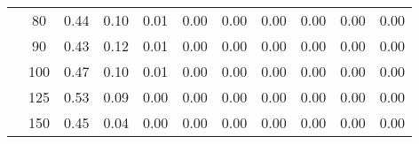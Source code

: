 \begin{table}[t]
\begin{center}
\begin{subtable}[c]{\textwidth}
\begin{center}
\begin{tabular}{rcccccccccc}
                                            & \multicolumn{1}{c|}{80}  & \num{0.44}  & \num{0.10}  & \num{0.01}  & \num{0.00}  & \num{0.00}  & \num{0.00}  & \num{0.00}  & \num{0.00}  & \num{0.00}  \\
                                            & \multicolumn{1}{c|}{90}  & \num{0.43}  & \num{0.12}  & \num{0.01}  & \num{0.00}  & \num{0.00}  & \num{0.00}  & \num{0.00}  & \num{0.00}  & \num{0.00}  \\
                                            & \multicolumn{1}{c|}{100}  & \num{0.47}  & \num{0.10}  & \num{0.01}  & \num{0.00}  & \num{0.00}  & \num{0.00}  & \num{0.00}  & \num{0.00}  & \num{0.00}  \\
                                            & \multicolumn{1}{c|}{125}  & \num{0.53}  & \num{0.09}  & \num{0.00}  & \num{0.00}  & \num{0.00}  & \num{0.00}  & \num{0.00}  & \num{0.00}  & \num{0.00}  \\
                                            & \multicolumn{1}{c|}{150}  & \num{0.45}  & \num{0.04}  & \num{0.00}  & \num{0.00}  & \num{0.00}  & \num{0.00}  & \num{0.00}  & \num{0.00}  & \num{0.00}  \\
                                    \end{tabular}
            \end{center}
        \end{subtable}

        \vspace{5mm}


\end{center}
\end{table}
